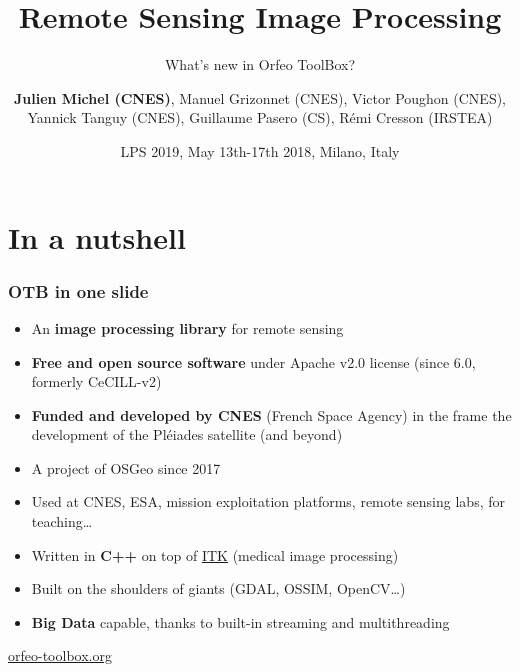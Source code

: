 \documentclass[8pt,aspectratio=169]{beamer}
\title{Remote Sensing Image Processing}
\subtitle{What's new in Orfeo ToolBox?}
\author{\textbf{Julien Michel (CNES)}, Manuel Grizonnet (CNES), Victor Poughon (CNES), Yannick Tanguy (CNES), Guillaume Pasero (CS), Rémi Cresson (IRSTEA)}
\date{LPS 2019, May 13th-17th 2018, Milano, Italy}
\begin{document}
\begin{frame}
\titlepage
\end{frame}

\section{In a nutshell}

  \begin{frame}
    \frametitle{OTB in one slide}

      \begin{itemize}
      \item An \textbf{image processing library} for remote sensing
      \item \textbf{Free and open source software} under Apache v2.0 license (since 6.0, formerly CeCILL-v2)
      \item \textbf{Funded and developed by CNES} (French Space Agency) in the frame
        the development of the Pléiades satellite (and beyond)
      \item A project of OSGeo since 2017
      \item Used at CNES, ESA, mission exploitation platforms,
        remote sensing labs, for teaching\ldots
      \item Written in \textbf{C++} on top of \href{www.itk.org}{ITK} (medical image
        processing)
      \item Built on the shoulders of giants (GDAL, OSSIM, OpenCV\ldots)
      \item \textbf{Big Data} capable, thanks to built-in streaming and multithreading
      \end{itemize}

    
    \begin{center}
      {\huge\textcolor{red}{\href{http://www.orfeo-toolbox.org}{orfeo-toolbox.org}}}
    \end{center}
  \end{frame}
\end{document}
